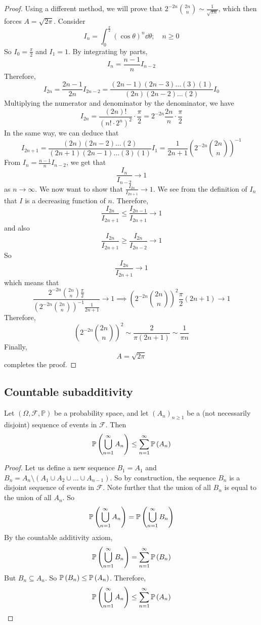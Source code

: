 \begin{proof}
	Using a different method, we will prove that \(2^{-2n} \binom{2n}{n} \sim \frac{1}{\sqrt{\pi n}}\), which then forces \(A = \sqrt{2\pi}\).
	Consider
	\[
		I_n = \int_0^{\frac{\pi}{2}} (\cos \theta)^n \dd{\theta};\quad n \geq 0
	\]
	So \(I_0 = \frac{\pi}{2}\) and \(I_1 = 1\).
	By integrating by parts,
	\[
		I_n = \frac{n-1}{n}I_{n-2}
	\]
	Therefore,
	\[
		I_{2n} = \frac{2n-1}{2n}I_{2n-2} = \frac{(2n-1)(2n-3)\dots(3)(1)}{(2n)(2n-2)\dots(2)}I_0
	\]
	Multiplying the numerator and denominator by the denominator, we have
	\[
		I_{2n} = \frac{(2n)!}{(n!
			\cdot 2^n)^2} \cdot \frac{\pi}{2} = 2^{-2n} \frac{2n}{n} \cdot \frac{\pi}{2}
	\]
	In the same way, we can deduce that
	\[
		I_{2n+1} = \frac{(2n)(2n-2)\dots(2)}{(2n+1)(2n-1)\dots(3)(1)}I_1 = \frac{1}{2n+1} \left( 2^{-2n} \binom{2n}{n} \right)^{-1}
	\]
	From \(I_n = \frac{n-1}{n}I_{n-2}\), we get that
	\[
		\frac{I_n}{I_{n-2}} \to 1
	\]
	as \(n \to \infty\).
	We now want to show that \(\frac{I_{2n}}{I_{2n+1}} \to 1\).
	We see from the definition of \(I_n\) that \(I\) is a decreasing function of \(n\).
	Therefore,
	\[
		\frac{I_{2n}}{I_{2n+1}} \leq \frac{I_{2n-1}}{I_{2n+1}} \to 1
	\]
	and also
	\[
		\frac{I_{2n}}{I_{2n+1}} \geq \frac{I_{2n}}{I_{2n-2}} \to 1
	\]
	So
	\[
		\frac{I_{2n}}{I_{2n+1}} \to 1
	\]
	which means that
	\[
		\frac{2^{-2n} \binom{2n}{n} \frac{\pi}{2}}{\left( 2^{-2n} \binom{2n}{n} \right)^{-1} \frac{1}{2n+1}} \to 1 \implies \left( 2^{-2n} \binom{2n}{n} \right)^2 \frac{\pi}{2} (2n+1) \to 1
	\]
	Therefore,
	\[
		\left( 2^{-2n} \binom{2n}{n} \right)^2 \sim \frac{2}{\pi (2n+1)} \sim \frac{1}{\pi n}
	\]
	Finally,
	\[
		A = \sqrt{2 \pi}
	\]
	completes the proof.
\end{proof}

\subsection{Countable subadditivity}
Let \((\Omega, \mathcal F, \mathbb P)\) be a probability space, and let \((A_n)_{n \geq 1}\) be a (not necessarily disjoint) sequence of events in \(\mathcal F\).
Then
\[
	\mathbb{P}\left({\bigcup_{n=1}^\infty A_n}\right) \leq \sum_{n=1}^\infty \mathbb{P}\left({A_n}\right)
\]
\begin{proof}
	Let us define a new sequence \(B_1 = A_1\) and \(B_n = A_n \setminus (A_1 \cup A_2 \cup \dots \cup A_{n-1})\).
	So by construction, the sequence \(B_n\) is a disjoint sequence of events in \(\mathcal F\).
	Note further that the union of all \(B_n\) is equal to the union of all \(A_n\).
	So
	\[
		\mathbb{P}\left({\bigcup_{n=1}^\infty A_n}\right) = \mathbb{P}\left({\bigcup_{n=1}^\infty B_n}\right)
	\]
	By the countable additivity axiom,
	\[
		\mathbb{P}\left({\bigcup_{n=1}^\infty B_n}\right) = \sum_{n=1}^\infty \mathbb{P}\left({B_n}\right)
	\]
	But \(B_n \subseteq A_n\).
	So \(\mathbb{P}\left({B_n}\right) \leq \mathbb{P}\left({A_n}\right)\).
	Therefore,
	\[
		\mathbb{P}\left({\bigcup_{n=1}^\infty A_n}\right) \leq \sum_{n=1}^\infty \mathbb{P}\left({A_n}\right)
	\]
\end{proof}
